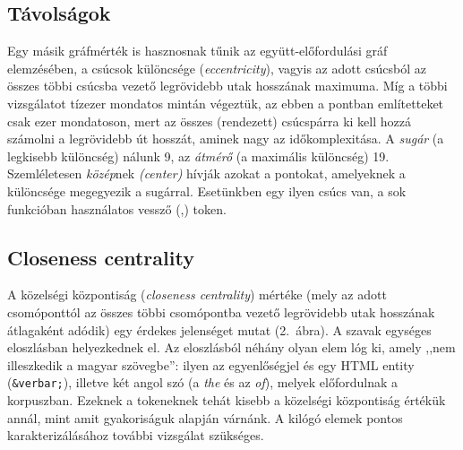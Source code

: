 \documentclass{llncs}
\newcommand{\embf}[1]{\textbf{#1}}
\newcommand{\liex}[1]{\emph{#1}}
\newcommand{\bness}{bness}   %
\begin{document}
\subsection{Távolságok}
  Egy másik gráfmérték is hasznosnak tűnik az együtt-előfordulási gráf
    elemzésében, a csúcsok különcsége (\emph{eccentricity}), vagyis
    az adott csúcsból az összes többi
    csúcsba vezető legrövidebb utak hosszának maximuma.
    Míg a többi vizsgálatot
    tízezer mondatos mintán végeztük, az ebben a pontban említetteket csak ezer
    mondatoson, mert az összes (rendezett) csúcspárra ki kell hozzá számolni a legrövidebb
    út hosszát, aminek nagy az időkomplexitása.
    A \emph{sugár} (a legkisebb különcség) nálunk 9,
    az \emph{átmérő} (a maximális különcség) 19.
    Szemléletesen \emph{közép}nek \emph{(center)}
    hívják azokat a pontokat, amelyeknek a különcsége megegyezik a sugárral.
    Esetünkben egy ilyen csúcs van, a sok funkcióban használatos vessző (,) token.


\subsection{Closeness centrality}

A közelségi központiság (\emph{closeness centrality}) mértéke (mely
az adott csomóponttól az összes többi csomópontba vezető
legrövidebb utak hosszának átlagaként adódik)
egy érdekes jelenséget mutat
(2.~ábra).  %
%
A szavak egységes eloszlásban helyezkednek el.
Az eloszlásból néhány olyan elem lóg ki, amely
,,nem illeszkedik a magyar szövegbe'':
ilyen az egyenlőségjel és egy HTML entity ({\tt \&verbar;}),
illetve két angol szó (a \liex{the} és az \liex{of}),
melyek előfordulnak a korpuszban.
%
Ezeknek a tokeneknek tehát kisebb
a közelségi központiság értékük annál,
mint amit gyakoriságuk alapján várnánk.
%
A kilógó elemek pontos karakterizálásához további vizsgálat szükséges.
%
\end{document}
